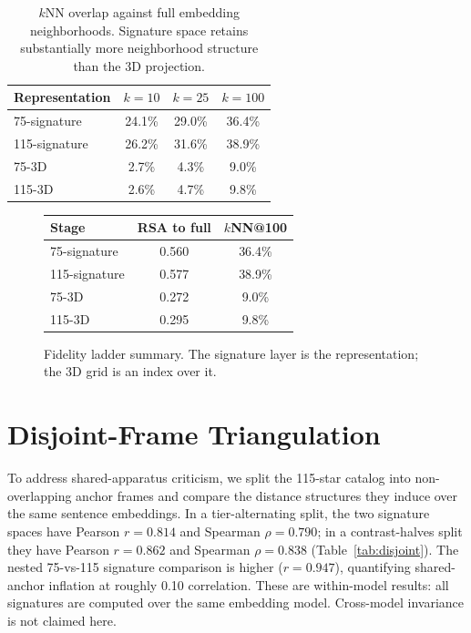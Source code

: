 \documentclass[11pt]{article}
\begin{document}
\begin{table}[t]
\centering
\small
\begin{tabular}{@{}lccc@{}}
\toprule
Representation & $k=10$ & $k=25$ & $k=100$ \\
\midrule
75-signature & 24.1\% & 29.0\% & 36.4\% \\
115-signature & 26.2\% & 31.6\% & 38.9\% \\
75-3D & 2.7\% & 4.3\% & 9.0\% \\
115-3D & 2.6\% & 4.7\% & 9.8\% \\
\bottomrule
\end{tabular}
\caption{$k$NN overlap against full embedding neighborhoods. Signature space retains substantially more neighborhood structure than the 3D projection.}
\label{tab:knn}
\end{table}

\begin{figure}[t]
\centering
\small
\begin{tabular}{@{}lcc@{}}
\toprule
Stage & RSA to full & $k$NN@100 \\
\midrule
75-signature & 0.560 & 36.4\% \\
115-signature & 0.577 & 38.9\% \\
75-3D & 0.272 & 9.0\% \\
115-3D & 0.295 & 9.8\% \\
\bottomrule
\end{tabular}
\caption{Fidelity ladder summary. The signature layer is the representation; the 3D grid is an index over it.}
\label{fig:fidelity-ladder}
\end{figure}

\section{Disjoint-Frame Triangulation}
\label{sec:disjoint}

To address shared-apparatus criticism, we split the 115-star catalog into non-overlapping anchor frames and compare the distance structures they induce over the same sentence embeddings. In a tier-alternating split, the two signature spaces have Pearson $r=0.814$ and Spearman $\rho=0.790$; in a contrast-halves split they have Pearson $r=0.862$ and Spearman $\rho=0.838$ (Table~\ref{tab:disjoint}). The nested 75-vs-115 signature comparison is higher ($r=0.947$), quantifying shared-anchor inflation at roughly 0.10 correlation. These are within-model results: all signatures are computed over the same embedding model. Cross-model invariance is not claimed here.
\end{document}
